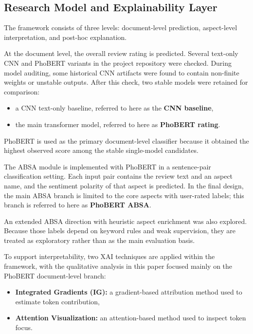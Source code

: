 \documentclass[a4paper,12pt]{extarticle}
\begin{document}
\subsection{Research Model and Explainability Layer}

The framework consists of three levels: document-level prediction, aspect-level interpretation, and post-hoc explanation.

At the document level, the overall review rating is predicted. Several text-only CNN and PhoBERT variants in the project repository were checked. During model auditing, some historical CNN artifacts were found to contain non-finite weights or unstable outputs. After this check, two stable models were retained for comparison:


\begin{itemize}[leftmargin=1.5em]
\item a CNN text-only baseline, referred to here as the \textbf{CNN baseline},
\item the main transformer model, referred to here as \textbf{PhoBERT rating}.
\end{itemize}



PhoBERT is used as the primary document-level classifier because it obtained the highest observed score among the stable single-model candidates.



The ABSA module is implemented with PhoBERT in a sentence-pair classification setting. Each input pair contains the review text and an aspect name, and the sentiment polarity of that aspect is predicted. In the final design, the main ABSA branch is limited to the core aspects with user-rated labels; this branch is referred to here as \textbf{PhoBERT ABSA}.


An extended ABSA direction with heuristic aspect enrichment was also explored. Because those labels depend on keyword rules and weak supervision, they are treated as exploratory rather than as the main evaluation basis.


To support interpretability, two XAI techniques are applied within the framework, with the qualitative analysis in this paper focused mainly on the PhoBERT document-level branch:


\begin{itemize}[leftmargin=1.5em]
\item \textbf{Integrated Gradients (IG):} a gradient-based attribution method used to estimate token contribution,
\item \textbf{Attention Visualization:} an attention-based method used to inspect token focus.
\end{itemize}
\end{document}
